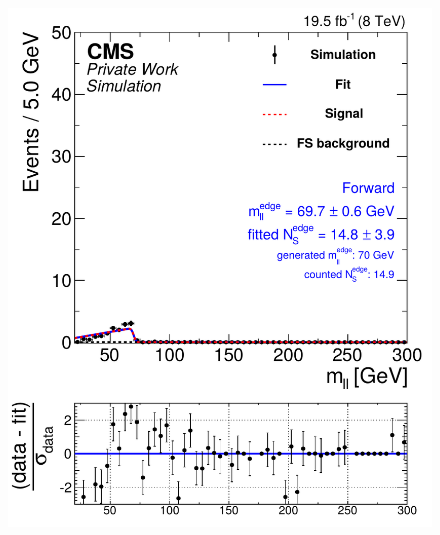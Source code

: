 \begin{figure}[hbp]
\begin{minipage}[t]{0.49\textwidth}
    \includegraphics[width=\textwidth]{plots/results/fit/mcFits/shapeIllustrationKTriangle_SignalInclusive_Combined_Full2012_KTriangle_MC_edge_400_150_80_Forward.pdf}
  \end{minipage}
  \begin{minipage}[t]{0.49\textwidth}

\end{minipage}
\end{figure}
